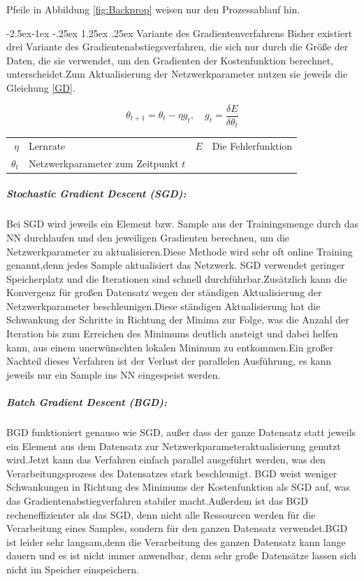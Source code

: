 \documentclass[12pt,a4paper]{scrartcl}
\makeatletter
\numberwithin{equation}{section}
\renewcommand\paragraph{\@startsection{paragraph}{4}{\z@}%
	{-2.5ex\@plus -1ex \@minus -.25ex}%
	{1.25ex \@plus .25ex}%
	{\normalfont\normalsize\bfseries}}
\makeatother
\begin{document}
Pfeile in Abbildung \ref{fig:Backprop} weisen nur den Prozessablauf hin.







\paragraph{Variante des Gradientenverfahrens}
Bisher existiert drei Variante des Gradientenabstiegsverfahren, die sich nur durch die Größe der Daten, die sie verwendet, um den Gradienten der Kostenfunktion berechnet, unterscheidet.Zum Aktualisierung der Netzwerkparameter nutzen sie jeweils die Gleichung \eqref{GD}.

\begin{equation}\label{GD}
	\theta_{t+1} = \theta_{t} -\eta g_{t}, \quad g_t=\frac{\delta E}{\delta \theta_{t}}
\end{equation}
\begin{center}
	\begin{tabular}{r@{: }l r@{: }l}
	 $ \eta$& Lernrate & $ E$ & Die Fehlerfunktion\\
	 $ \theta_{t} $& Netzwerkparameter zum Zeitpunkt $ t $
	\end{tabular}
\end{center}
\subparagraph{Stochastic Gradient Descent (SGD):}
		Bei SGD wird jeweils ein Element bzw. Sample aus der Trainingsmenge durch das \ac{NN} durchlaufen und den jeweiligen Gradienten berechnen, um die Netzwerkparameter zu aktualisieren.Diese Methode wird sehr oft online Training  genannt,denn jedes Sample aktualisiert das Netzwerk. SGD verwendet geringer Speicherplatz und die Iterationen sind schnell durchführbar.Zusätzlich kann die Konvergenz für großen Datensatz wegen der ständigen Aktualisierung der Netzwerkparameter beschleunigen.Diese ständigen Aktualisierung hat die Schwankung der Schritte in Richtung der Minima zur Folge, was die Anzahl der Iteration bis zum Erreichen des Minimums deutlich ansteigt und dabei helfen kann, aus einem unerwünschten lokalen Minimum zu entkommen.Ein großer Nachteil dieses Verfahren ist der Verlust der parallelen Ausführung, es kann jeweils nur ein Sample ins \ac{NN} eingespeist werden.
\subparagraph{Batch Gradient Descent (BGD):}
		BGD funktioniert genauso wie SGD, außer dass der ganze Datensatz statt jeweils ein Element aus dem Datensatz zur Netzwerkparameteraktualisierung genutzt wird.Jetzt kann das Verfahren einfach parallel ausgeführt werden, was den Verarbeitungsprozess des Datensatzes stark beschleunigt. BGD weist weniger Schwankungen in Richtung des Minimums der Kostenfunktion als SGD auf, was das Gradientenabstiegverfahren stabiler macht.Außerdem ist das BGD recheneffizienter als das SGD, denn nicht alle Ressourcen werden für die Verarbeitung eines Samples, sondern für den ganzen Datensatz verwendet.BGD ist leider sehr langsam,denn die Verarbeitung des ganzen Datensatz kann lange dauern und es ist nicht immer anwendbar, denn sehr große Datensätze lassen sich nicht im Speicher einspeichern.
\end{document}
